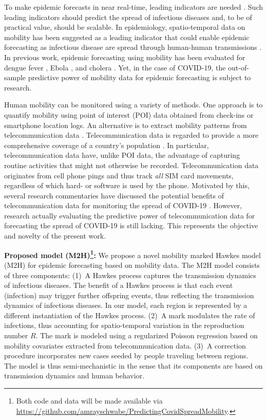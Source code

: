 \documentclass[sigconf, review = false, nonacm = true]{acmart}
\newcommand\modelAbbrv{M2H\xspace}
\newcommand\model{M2H model\xspace}
\begin{document}
To make epidemic forecasts in near real-time, leading indicators are needed \cite{grantz_use_2020}. Such leading indicators should predict the spread of infectious diseases and, to be of practical value, should be scalable. In epidemiology, spatio-temporal data on mobility has been suggested as a leading indicator that could enable epidemic forecasting as infectious disease are spread through human-human transmissions \cite{desai_stopping_2020}. In previous work, epidemic forecasting using mobility has been evaluated for dengue fever \cite{kim_modeling_2019}, Ebola \cite{kelly_real-time_2019}, and cholera \cite{bengtsson_using_2015}. Yet, in the case of COVID-19, the out-of-sample predictive power of mobility data for epidemic forecasting is subject to research.

Human mobility can be monitored using a variety of methods. One approach is to quantify mobility using point of interest (POI) data obtained from check-ins \cite{chang_mobility_2021, benzell_rationing_2020, dave_when_2021} or smartphone location logs\cite{chinazzi_effect_2020,li_substantial_2020, bonaccorsi_economic_2020,chang_mobility_2021}. An alternative is to extract mobility patterns from telecommunication data \cite{persson_monitoring_2021}. Telecommunication data is regarded to provide a more comprehensive coverage of a country's population \cite{oliver_mobile_2020, grantz_use_2020}. In particular, telecommunication data have, unlike POI data, the advantage of capturing routine activities that might not otherwise be recorded. Telecommunication data originates from cell phone pings and thus track \emph{all} SIM card movements, regardless of which hard- or software is used by the phone. Motivated by this, several research commentaries have discussed the potential benefits of telecommunication data for monitoring the spread of COVID-19 \cite{oliver_mobile_2020, grantz_use_2020}. However, research actually evaluating the predictive power of telecommunication data for forecasting the spread of COVID-19 is still lacking. This represents the objective and novelty of the present work.

\textbf{Proposed model (\modelAbbrv)\footnote{Both code and data will be made available via \url{https://github.com/amrayschwabe/PredictingCovidSpreadMobility}.}:} 
We propose a novel mobility marked Hawkes model (\modelAbbrv) for epidemic forecasting based on mobility data. The \model consists of three components: (1)~A Hawkes process captures the transmission dynamics of infectious diseases. The benefit of a Hawkes process is that each event (infection) may trigger further offspring events, thus reflecting the transmission dynamics of infectious diseases. In our model, each region is represented by a different instantiation of the Hawkes process. (2)~A mark modulates the rate of infections, thus accounting for spatio-temporal variation in the reproduction number $R$. The mark is modeled using a regularized Poisson regression based on mobility covariates extracted from telecommunication data. (3)~A correction procedure incorporates new cases seeded by people traveling between regions. The model is thus semi-mechanistic in the sense that its components are based on transmission dynamics and human behavior. 
\end{document}
